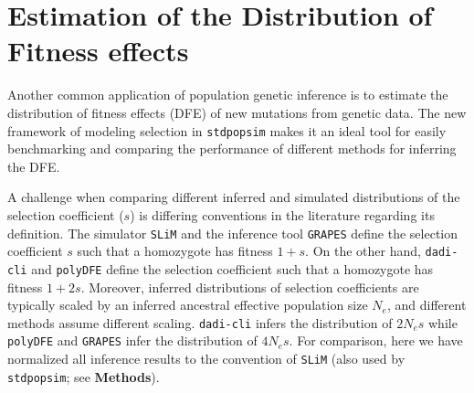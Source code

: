 \documentclass[hidelinks]{article}
\newcommand{\stdpopsim}{\texttt{stdpopsim}\xspace}
\newcommand{\slim}{\texttt{SLiM}\xspace}
\newcommand{\polydfe}{\texttt{polyDFE}\xspace}
\newcommand{\dadicli}{\texttt{dadi-cli}\xspace}
\newcommand{\grapes}{\texttt{GRAPES}\xspace}
\begin{document}
\section*{Estimation of the Distribution of Fitness effects}
    \label{dfe}
    Another common application of population genetic inference is to estimate the distribution of fitness effects (DFE) of new mutations
    from genetic data. The new framework of modeling selection in \stdpopsim makes it an ideal tool for easily benchmarking and comparing
    the performance of different methods for inferring the DFE. 

    A challenge when comparing different inferred and simulated distributions of the selection coefficient ($s$)
    is differing conventions in the literature regarding its definition.
    The simulator \slim and the inference tool \grapes define the selection coefficient $s$ such that a homozygote has fitness $1+s$.
    On the other hand, \dadicli and \polydfe define the selection coefficient such that a homozygote has fitness $1+ 2s$.
    Moreover, inferred distributions of selection coefficients are typically scaled by an inferred ancestral
    effective population size $N_e$, and different methods assume different scaling.
    \dadicli infers the distribution of $2 N_e s$ while \polydfe and \grapes infer the distribution of $4 N_e s$.
    For comparison, here we have normalized all inference results to the convention of \slim
    (also used by \stdpopsim; see \textbf{Methods}).
\end{document}
